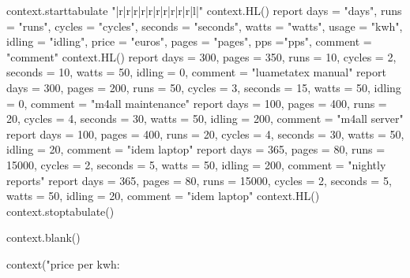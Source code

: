     context.starttabulate { "|r|r|r|r|r|r|r|r|r|r|l|" }
        context.HL()
        report {
            days = "days", runs = "runs", cycles = "cycles", seconds = "seconds", watts = "watts",
            usage = "kwh", idling = "idling", price = "euros", pages = "pages", pps ="pps", comment = "comment"
        }
        context.HL()
            report { days = 300, pages = 350, runs =    10, cycles = 2, seconds =  10, watts = 50, idling =   0, comment = "luametatex manual" }
            report { days = 300, pages = 200, runs =    50, cycles = 3, seconds =  15, watts = 50, idling =   0, comment = "m4all maintenance" }
            report { days = 100, pages = 400, runs =    20, cycles = 4, seconds =  30, watts = 50, idling = 200, comment = "m4all server" }
            report { days = 100, pages = 400, runs =    20, cycles = 4, seconds =  30, watts = 50, idling =  20, comment = "idem laptop" }
            report { days = 365, pages =  80, runs = 15000, cycles = 2, seconds =   5, watts = 50, idling = 200, comment = "nightly reports" }
            report { days = 365, pages =  80, runs = 15000, cycles = 2, seconds =   5, watts = 50, idling =  20, comment = "idem laptop" }
        context.HL()
    context.stoptabulate()

    context.blank()

    context("price per kwh: %
\stopluacode

\stop

\stoptitle

\stopdocument

